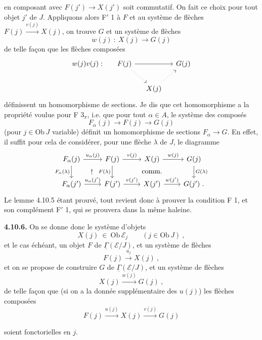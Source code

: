 \documentclass[11pt]{article}
\newcommand{\printedpage}[1]{\marginpar{\footnotesize p.~#1}}
\newcommand{\msp}[1]{\marginpar{\footnotesize [#1]}}
\newcommand{\uGamma}{\underline{\Gamma}}
\newcommand{\Ob}{\mathrm{Ob}\,}
\begin{document}
\msp{253}
en composant avec $F(j')\longrightarrow X(j')$ soit commutatif. On fait ce choix pour tout objet $j'$ de $J$. Appliquons alors F$'$ 1 à $F$ et au système de flèches $F(j)\xrightarrow{v(j)}X(j)$, on trouve $G$ et un système de flèches
\[
w(j)\ :\ X(j) \longrightarrow G(j)
\]
de telle façon que les flèches composées
\[
\begin{tikzcd}[column sep=small]
w(j)v(j) : & F(j) \arrow[rr] \arrow[dr,dotted] & & G(j) \\
& & X(j) \arrow[ur,dotted] &
\end{tikzcd}
\]
définissent un homomorphisme de sections. Je dis que cet homomorphisme a la propriété voulue pour F $3_\pi$, i.e. que pour tout $\alpha\in A$, le système des composés
\[
F_\alpha(j) \longrightarrow F(j) \longrightarrow G(j)
\]
(pour $j\in\Ob J$ variable) définit un homomorphisme de sections $F_\alpha\longrightarrow G$. En effet, il suffit pour cela de considérer, pour une flèche $\lambda$ de $J$, le
\printedpage{96}
\msp{254}
diagramme
\[
\begin{tikzcd}
F_\alpha(j) \arrow[r,"u_\alpha(j)"] \arrow[d,"F_\alpha(\lambda)"'] \arrow[dr,phantom,"!"] & F(j) \arrow[r,"v(j)"] \arrow[d,"F(\lambda)"'] & X(j) \arrow[r,"w(j)"] \arrow[d,phantom,"\text{comm.}"] & G(j) \arrow[d,"G(\lambda)"] \\
F_\alpha(j') \arrow[r,"u_\alpha(j')"] & F(j') \arrow[r,"v(j')"] & X(j') \arrow[r,"w(j')"] & G(j')\ .
\end{tikzcd}
\]
Le lemme 4.10.5 étant prouvé, tout revient donc à prouver la condition F 1, et son complément F$'$ 1, qui se prouvera dans la même haleine.

\textbf{4.10.6.} On se donne donc le système d'objets
\[
X(j)\ \in\ \Ob\mathcal{E}_j \qquad (j\in\Ob J)\ , \tag*{(4.10.6.1)}
\]
et le cas échéant, un objet $F$ de $\uGamma(\mathcal{E}/J)$, et un système de flèches
\[
F(j) \xrightarrow{u_j} X(j)\ , \tag*{(4.6.10.2)} %
\]
et on se propose de construire $G$ de $\uGamma(\mathcal{E}/J)$, et un système de flèches
\[
X(j) \xrightarrow{w(j)} G(j)\ , \tag*{(4.10.6.3)}
\]
de telle façon que (si on a la donnée supplémentaire des $u(j)$) les flèches composées
\[
F(j) \xrightarrow{u(j)} X(j) \xrightarrow{v(j)} G(j) %
\]

\msp{255}
soient fonctorielles en $j$.
\end{document}
